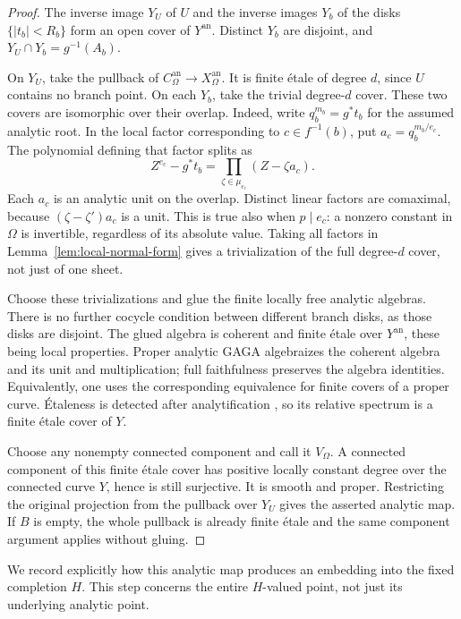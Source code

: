 \begin{proof}
The inverse image $Y_U$ of $U$ and the inverse images $Y_b$ of the disks
$\{|t_b|<R_b\}$ form an open cover of $Y^{\mathrm{an}}$.  Distinct
$Y_b$ are disjoint, and $Y_U\cap Y_b=g^{-1}(A_b)$.

On $Y_U$, take the pullback of $C_\Omega^{\mathrm{an}}\to
X_\Omega^{\mathrm{an}}$.  It is finite étale of degree $d$, since $U$
contains no branch point.  On each $Y_b$, take the trivial degree-$d$
cover.  These two covers are isomorphic over their overlap.  Indeed,
write $q_b^{m_b}=g^*t_b$ for the assumed analytic root.  In the local
factor corresponding to $c\in f^{-1}(b)$, put
$a_c=q_b^{m_b/e_c}$.  The polynomial defining that factor splits as
\[
 Z^{e_c}-g^*t_b=\prod_{\zeta\in\mu_{e_c}}(Z-\zeta a_c).
\]
Each $a_c$ is an analytic unit on the overlap.  Distinct linear factors
are comaximal, because $(\zeta-\zeta')a_c$ is a unit.  This is true also
when $p\mid e_c$: a nonzero constant in $\Omega$ is invertible, regardless
of its absolute value.  Taking all factors in
Lemma~\ref{lem:local-normal-form} gives a trivialization of the full
degree-$d$ cover, not just of one sheet.

Choose these trivializations and glue the finite locally free analytic
algebras.  There is no further cocycle condition between different branch
disks, as those disks are disjoint.  The glued algebra is coherent and
finite étale over $Y^{\mathrm{an}}$, these being local properties.
Proper analytic GAGA \cite[Appendix~A, Theorem~A.1(ii)]{GAGA} algebraizes the coherent algebra and
its unit and multiplication; full faithfulness preserves the algebra
identities.  Equivalently, one uses the corresponding equivalence for
finite covers of a proper curve.  \'Etaleness is detected after
analytification \cite[Fact~5.1.5]{TemkinAnalytic}, so its relative spectrum is a finite étale cover of $Y$.

Choose any nonempty connected component and call it $V_\Omega$.
A connected component of this finite étale cover has positive locally
constant degree over the connected curve $Y$, hence is still surjective.
It is smooth and proper.  Restricting the original projection from the
pullback over $Y_U$ gives the asserted analytic map.  If $B$ is empty,
the whole pullback is already finite étale and the same component
argument applies without gluing.
\end{proof}

We record explicitly how this analytic map produces an embedding into
the fixed completion $H$.  This step concerns the entire $H$-valued
point, not just its underlying analytic point.

